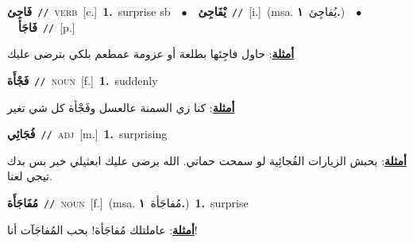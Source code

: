 \documentclass[10pt,a4paper,twoside]{article} %
\begin{document}
\begin{multicols}{2}
{{{{{{{{{\setlength\topsep{0pt}\textbf{\foreignlanguage{arabic}{فَاجِئ}}\ {\color{gray}\texttt{//}\color{black}}\ \textsc{verb}\ [c.]\ \textbf{1.}~surprise sb\ \ $\bullet$\ \ \setlength\topsep{0pt}\textbf{\foreignlanguage{arabic}{يْفَاجِئ}}\ {\color{gray}\texttt{//}\color{black}}\ [i.]\ \color{gray}(msa. \foreignlanguage{arabic}{يُفاجِئ}~\foreignlanguage{arabic}{\textbf{١.}})\color{black}\ \ $\bullet$\ \ \setlength\topsep{0pt}\textbf{\foreignlanguage{arabic}{فَاجَأ}}\ {\color{gray}\texttt{//}\color{black}}\ [p.]\  \begin{flushright}\color{gray}\foreignlanguage{arabic}{\textbf{\underline{\foreignlanguage{arabic}{أمثلة}}}: حاول فاجِئها بطلعة أو عزومة عمطعم بلكي بترضى عليك}\end{flushright}\color{black}} \vspace{2mm}

{\setlength\topsep{0pt}\textbf{\foreignlanguage{arabic}{فَجْأَة}}\ {\color{gray}\texttt{//}\color{black}}\ \textsc{noun}\ [f.]\ \textbf{1.}~suddenly\  \begin{flushright}\color{gray}\foreignlanguage{arabic}{\textbf{\underline{\foreignlanguage{arabic}{أمثلة}}}: كنا زي السمنة عالعسل وفَجْأة كل شي تغير}\end{flushright}\color{black}} \vspace{2mm}

{\setlength\topsep{0pt}\textbf{\foreignlanguage{arabic}{فُجَائِي}}\ {\color{gray}\texttt{//}\color{black}}\ \textsc{adj}\ [m.]\ \textbf{1.}~surprising\  \begin{flushright}\color{gray}\foreignlanguage{arabic}{\textbf{\underline{\foreignlanguage{arabic}{أمثلة}}}: بحبش الزيارات الفُجائِية لو سمحت حماتي. الله يرضى عليك ابعثيلي خبر بس بدك تيجي لعنا.}\end{flushright}\color{black}} \vspace{2mm}

{\setlength\topsep{0pt}\textbf{\foreignlanguage{arabic}{مُفَاجَأَة}}\ {\color{gray}\texttt{//}\color{black}}\ \textsc{noun}\ [f.]\ \color{gray}(msa. \foreignlanguage{arabic}{مُفاجَأة}~\foreignlanguage{arabic}{\textbf{١.}})\color{black}\ \textbf{1.}~surprise\  \begin{flushright}\color{gray}\foreignlanguage{arabic}{\textbf{\underline{\foreignlanguage{arabic}{أمثلة}}}: عاملتلك مُفاجَأة! بحب المُفاجَآت أنا!}\end{flushright}\color{black}} \vspace{2mm}

}}}}}}}}
\end{multicols}
\end{document}

